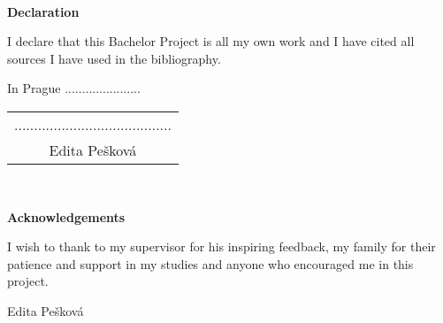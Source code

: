 \documentclass[a4paper,12pt]{report}
\newcommand{\autor}{Edita Pešková}           %
\begin{document}
~ %
\vfill %

{\bf Declaration} %

\vspace{0.5cm} %
I declare that this Bachelor Project is all my own work and I have cited all sources I have used in the bibliography.

\vspace{5mm}In Prague ......................\hfill   %
    \begin{tabular}{c}                               %
    ........................................\\       %
    \autor                                           %
    \end{tabular}                                    %



\newpage
\thispagestyle{empty}

~
\vfill %

{\bf Acknowledgements }

\vspace{5mm} %

I wish to thank to my supervisor for his inspiring feedback, my family for their patience and support in my studies and anyone who encouraged me in this project. 

\begin{flushright}
\autor
\end{flushright}  %



\newpage   %
\thispagestyle{empty}   %

\newbox\odstavecbox
\newlength\vyskaodstavce
\newcommand\odstavec[2]{%
    \setbox\odstavecbox=\hbox{%
         \parbox[t]{#1}{#2\vrule width 0pt depth 4pt}}%
    \global\vyskaodstavce=\dp\odstavecbox
    \box\odstavecbox}
\newcommand{\delka}{120mm} %
\end{document}
